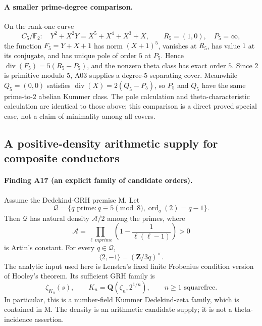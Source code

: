 \documentclass[11pt,a4paper]{article}
\begin{document}
\paragraph{A smaller prime-degree comparison.}
On the rank-one curve
\[
 C_5/\mathbb F_2:\quad
 Y^2+X^2Y=X^5+X^4+X^3+X,
 \qquad R_5=(1,0),\quad P_5=\infty,
\]
the function $F_5=Y+X+1$ has norm $(X+1)^5$, vanishes at $R_5$,
has value $1$ at its conjugate, and has unique pole of order $5$
at $P_5$. Hence $\operatorname{div}(F_5)=5(R_5-P_5)$, and the
nonzero theta class has exact order $5$. Since $2$ is primitive
modulo $5$, A03 supplies a degree-$5$ separating cover. Meanwhile
$Q_5=(0,0)$ satisfies $\operatorname{div}(X)=2(Q_5-P_5)$, so
$P_5$ and $Q_5$ have the same prime-to-$2$ abelian Kummer class.
The pole calculation and theta-characteristic calculation are
identical to those above; this comparison is a direct proved
special case, not a claim of minimality among all covers.


\subsection{A positive-density arithmetic supply for composite conductors}
\label{sec:three-times-artin-prime}

\paragraph{Finding A17 (an explicit family of candidate orders).}
Assume the Dedekind-GRH premise M. Let
\[
 \mathcal Q=\{q\text{ prime}:q\equiv5\pmod8,
                         \operatorname{ord}_q(2)=q-1\}.
\]
Then $\mathcal Q$ has natural density $\mathcal A/2$ among the
primes, where
\[
 \mathcal A=\prod_{\ell\ {
m prime}}
                      \left(1-\frac1{\ell(\ell-1)}\right)>0
\]
is Artin's constant. For every $q\in\mathcal Q$,
\[
                  \langle2,-1\rangle=(\mathbf Z/3q)^\times.
                                                               \tag{AF.1}
\]
The analytic input used here is Lenstra's fixed finite Frobenius
condition version of Hooley's theorem. Its sufficient GRH family is
\[
 \zeta_{K_n}(s),\qquad
 K_n=\mathbf Q(\zeta_n,2^{1/n}),\qquad
 n\ge1\text{ squarefree}.                                    \tag{AF.2}
\]
In particular, this is a number-field Kummer Dedekind-zeta family,
which is contained in M. The density is an arithmetic candidate
supply; it is not a theta-incidence assertion.
\end{document}

